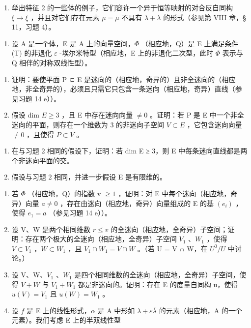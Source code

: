 \begin{enumerate}
\def\labelenumi{\alph{enumi})}
\setcounter{enumi}{1}
\tightlist
\item
  举出特征 2 的一些体的例子，它们容许一个异于恒等映射的对合反自同构 \(\xi \to \overline{\xi}\) ，并且对它们存在元素 \(\mu = \bar{\mu}\) 不具有 \(\lambda + \bar{\lambda}\) 的形式（参见第 VIII 章，§ 11，习题 4）。
\end{enumerate}

\begin{enumerate}
\def\labelenumi{\arabic{enumi})}
\setcounter{enumi}{1}
\tightlist
\item
  设 A 是一个体，E 是 A 上的向量空间，\(\Phi\) （相应地，Q）是 E 上满足条件 (T) 的非退化 \(\varepsilon\) -埃尔米特型（相应地，E 上的非退化二次型，此时 \(\Phi\) 表示与 Q 相伴的对称双线性型）。
\end{enumerate}

\begin{enumerate}
\def\labelenumi{\alph{enumi})}
\item
  证明：要使平面 P ⊂ E 是迷向的（相应地，奇异的）且非全迷向的（相应地，非全奇异的），必须且只需它只包含一条迷向（相应地，奇异）直线（参见习题 14 e））。
\item
  假设 dim \(E \geqslant 3\) ，且 E 中存在迷向向量 \(\neq 0\) 。证明：若 P 是 E 中一个非全迷向的平面，则存在一个维数为 3 的非迷向子空间 \(V \subset E\) ，它包含迷向向量 \(\neq 0\) ，且使得 \(P \subset V\) 。
\end{enumerate}

\begin{enumerate}
\def\labelenumi{\arabic{enumi})}
\setcounter{enumi}{2}
\item
  在与习题 2 相同的假设下，证明：若 dim E ≥ 3，则 E 中每条迷向直线都是两个非迷向平面的交。
\item
  假设与习题 2 相同，并进一步假设 E 是有限维的。
\end{enumerate}

\begin{enumerate}
\def\labelenumi{\alph{enumi})}
\item
  若 \(\Phi\) （相应地，Q）的指数 v \(\geqslant 1\) ，证明：对 E 中每个迷向（相应地，奇异）向量 \(a \neq 0\) ，存在由迷向（相应地，奇异）向量组成的 E 的基 \((e_i)\) ，使得 \(e_1 = a\) （参见习题 14 e））。
\item
  设 V、W 是两个相同维数 \(r \leqslant v\) 的全迷向（相应地，全奇异）子空间；证明：存在两个极大的全迷向（相应地，全奇异）子空间 \(V_{1}\) 、\(W_{1}\) ，使得 \(V \subset V_{1}\) ，\(W \subset W_{1}\) ，且 \(V_{1} \cap W_{1} = V \cap W\) 。（若 U = V ∩ W，在 \(U^{0}/U\) 中讨论。）
\item
  设 V、W、\(V_{1}\) 、\(W_{1}\) 是四个相同维数的全迷向（相应地，全奇异）子空间，使得 \(V + W\) 与 \(V_{1} + W_{1}\) 都是非迷向的。证明：存在 E 的度量自同构 u，使得 \(u(V) = V_{1}\) 且 \(u(W) = W_{1}\) 。
\item
  设 \(f\) 是 E 上的线性形式，\(\alpha\) 是 A 中形如 \(\lambda + \varepsilon\bar{\lambda}\) 的元素（相应地，A 的一个元素）。我们考虑 E 上的半双线性型
\end{enumerate}

